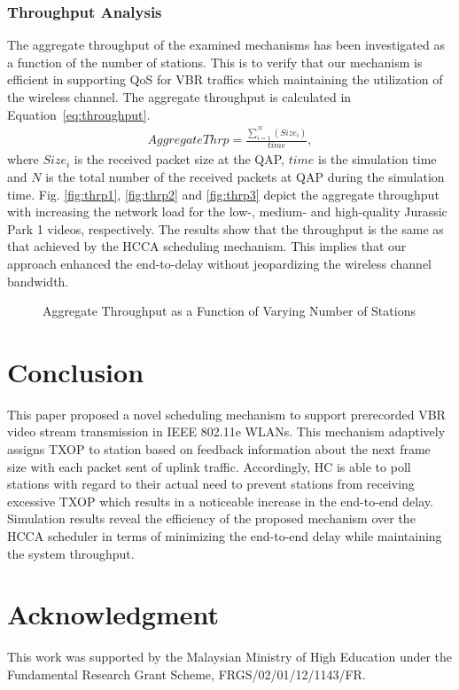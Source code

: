 \documentclass[a4paper, conference]{IEEEtran}
\begin{document}
\subsubsection{Throughput Analysis}
The aggregate throughput of the examined mechanisms has been investigated as a function of the number of stations. This is to verify that our mechanism is efficient in supporting QoS for VBR traffics which maintaining the utilization of the wireless channel. The aggregate throughput is calculated in Equation~\eqref{eq:throughput}.
\begin{eqnarray}
\label{eq:throughput}
AggregateThrp  = \frac { \sum_{i=1}^{N} ( Size_{i})  } {time},
\end{eqnarray}
where $Size_{i}$ is the received packet size at the QAP, $time$ is the simulation time and $N$ is the total number of the received packets at QAP during the simulation time. Fig. \ref{fig:thrp1},  \ref{fig:thrp2} and \ref{fig:thrp3} depict the aggregate throughput with increasing the network load for the low-, medium- and high-quality Jurassic Park 1 videos,  respectively. The results show that the throughput is the same as that achieved by the HCCA scheduling mechanism. This implies that our approach enhanced the end-to-delay without jeopardizing the wireless channel bandwidth.

\begin{figure}[t]
\centering
{}
\caption{Aggregate Throughput as a Function of Varying Number of Stations}
\end{figure}












\section{Conclusion}
\label{sec:conclusion}
This paper proposed a novel scheduling mechanism to support prerecorded VBR video stream transmission in IEEE 802.11e WLANs. This mechanism adaptively assigns TXOP to station based on feedback information about the next frame size with each packet sent of uplink traffic. Accordingly, HC is able to poll stations with regard to their actual need to prevent stations from receiving excessive TXOP which results in a noticeable increase in the end-to-end delay. Simulation results reveal the efficiency of the proposed mechanism over the HCCA scheduler in terms of minimizing the end-to-end delay while maintaining the system throughput.


\section*{Acknowledgment}
This work was supported by the Malaysian Ministry of High Education under the Fundamental Research Grant Scheme, FRGS/02/01/12/1143/FR.




\end{document}
